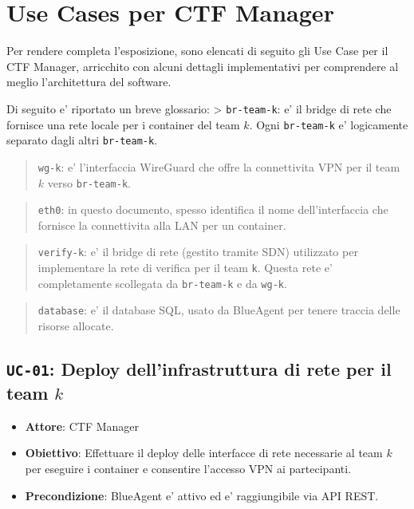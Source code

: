 \section{Use Cases per CTF Manager}\label{use-cases-per-ctf-manager}

Per rendere completa l'esposizione, sono elencati di seguito gli Use
Case per il CTF Manager, arricchito con alcuni dettagli implementativi
per comprendere al meglio l'architettura del software.

Di seguito e' riportato un breve glossario: \textgreater{}
\passthrough{\lstinline!br-team-k!}: e' il bridge di rete che fornisce
una rete locale per i container del team \(k\). Ogni
\passthrough{\lstinline!br-team-k!} e' logicamente separato dagli altri
\passthrough{\lstinline!br-team-k!}.

\begin{quote}
\passthrough{\lstinline!wg-k!}: e' l'interfaccia WireGuard che offre la
connettivita VPN per il team \(k\) verso
\passthrough{\lstinline!br-team-k!}.
\end{quote}

\begin{quote}
\passthrough{\lstinline!eth0!}: in questo documento, spesso identifica
il nome dell'interfaccia che fornisce la connettivita alla LAN per un
container.
\end{quote}

\begin{quote}
\passthrough{\lstinline!verify-k!}: e' il bridge di rete (gestito
tramite SDN) utilizzato per implementare la rete di verifica per il team
\passthrough{\lstinline!k!}. Questa rete e' completamente scollegata da
\passthrough{\lstinline!br-team-k!} e da \passthrough{\lstinline!wg-k!}.
\end{quote}

\begin{quote}
\passthrough{\lstinline!database!}: e' il database SQL, usato da
BlueAgent per tenere traccia delle risorse allocate.
\end{quote}

\subsection{\texorpdfstring{\texttt{UC-01}: Deploy dell'infrastruttura
di rete per il team
\(k\)}{UC-01: Deploy dell'infrastruttura di rete per il team k}}\label{uc-01-deploy-dellinfrastruttura-di-rete-per-il-team-k}

\begin{itemize}
\tightlist
\item
  \textbf{Attore}: CTF Manager
\item
  \textbf{Obiettivo}: Effettuare il deploy delle interfacce di rete
  necessarie al team \(k\) per eseguire i container e consentire
  l'accesso VPN ai partecipanti.
\item
  \textbf{Precondizione}: BlueAgent e' attivo ed e' raggiungibile via
  API REST.
\end{itemize}

